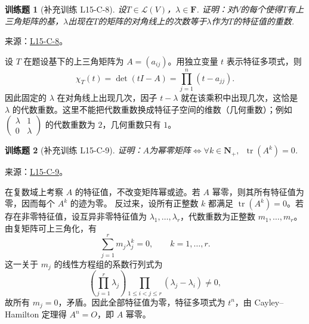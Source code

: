 \documentclass[UTF8,12pt,a4paper,fontset=fandol]{ctexart}
\newtheorem{exercise}{训练题}[section]
\begin{document}
\begin{exercise}[补充训练 L15-C-8]\label{prob:L15-C-8}
设$T\in \mathcal{L}(V)$，$\lambda\in\mathbf{F}$. 证明：对$V$的每个使得$T$有上三角矩阵的基，$\lambda$出现在$T$的矩阵的对角线上的次数等于$\lambda$作为$T$的特征值的重数.
\end{exercise}
\noindent 来源：\href{https://github.com/yhwu-is/Linear-Algebra-Left-Undone/blob/new/%E8%AE%B2%E4%B9%89/%E4%B8%93%E9%A2%98/15%20%E7%9B%B8%E4%BC%BC%E6%A0%87%E5%87%86%E5%BD%A2%EF%BC%9A%E5%A4%8D%E6%95%B0%E5%9F%9F%E4%B8%8A%E7%9A%84%E5%B0%9D%E8%AF%95%E4%B8%8E%E7%90%86%E8%AE%BA.tex}{L15-C-8}。
\begin{solve}
设 $T$ 在题设基下的上三角矩阵为 $A=(a_{ij})$。用独立变量 $t$ 表示特征多项式，则
\[\chi_T(t)=\det(tI-A)=\prod_{j=1}^n(t-a_{jj}).\]
因此固定的 $\lambda$ 在对角线上出现几次，因子 $t-\lambda$ 就在该乘积中出现几次，这恰是 $\lambda$ 的代数重数。这里不能把代数重数换成特征子空间的维数（几何重数）；例如 $\begin{pmatrix}\lambda&1\\0&\lambda\end{pmatrix}$ 的代数重数为 $2$，几何重数只有 $1$。
\end{solve}

\begin{exercise}[补充训练 L15-C-9]\label{prob:L15-C-9}
证明：$A$为幂零矩阵$\iff \forall k \in \mathbf{N}_+,\enspace\operatorname{tr}(A^k)=0$.
\end{exercise}
\noindent 来源：\href{https://github.com/yhwu-is/Linear-Algebra-Left-Undone/blob/new/%E8%AE%B2%E4%B9%89/%E4%B8%93%E9%A2%98/15%20%E7%9B%B8%E4%BC%BC%E6%A0%87%E5%87%86%E5%BD%A2%EF%BC%9A%E5%A4%8D%E6%95%B0%E5%9F%9F%E4%B8%8A%E7%9A%84%E5%B0%9D%E8%AF%95%E4%B8%8E%E7%90%86%E8%AE%BA.tex}{L15-C-9}。
\begin{solve}
在复数域上考察 $A$ 的特征值，不改变矩阵幂或迹。若 $A$ 幂零，则其所有特征值为零，因而每个 $A^k$ 的迹为零。
反过来，设所有正整数 $k$ 都满足 $\operatorname{tr}(A^k)=0$。若存在非零特征值，设互异非零特征值为 $\lambda_1,\ldots,\lambda_r$，代数重数为正整数 $m_1,\ldots,m_r$。由复矩阵可上三角化，有
\[\sum_{j=1}^r m_j\lambda_j^k=0,\qquad k=1,\ldots,r.\]
这一关于 $m_j$ 的线性方程组的系数行列式为
\[\left(\prod_{j=1}^r\lambda_j\right)\prod_{1\le i<j\le r}(\lambda_j-\lambda_i)\ne0,\]
故所有 $m_j=0$，矛盾。因此全部特征值为零，特征多项式为 $t^n$，由 Cayley--Hamilton 定理得 $A^n=O$，即 $A$ 幂零。
\end{solve}
\end{document}
